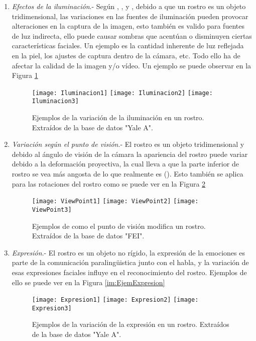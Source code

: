 \begin{enumerate}%
\item \textit{Efectos de la iluminación}.- Según \cite{kalocsai1998face}, \cite{johnston1992recognising}, \cite{bruce1998human} y \cite{hill1996effects}, debido a que un rostro es un objeto tridimensional, las variaciones en las fuentes de iluminación pueden provocar alteraciones en la captura de la imagen, esto también es valido para fuentes de luz indirecta, ello puede causar sombras que acentúan o disminuyen ciertas características faciales. Un ejemplo es la cantidad inherente de luz reflejada en la piel, los ajustes de captura dentro de la cámara, etc. Todo ello ha de afectar la calidad de la imagen y/o vídeo. Un ejemplo se puede observar en la Figura \ref{im:EjemIluminacion}
\begin{figure}[h]
\center
\texttt{[image: Iluminacion1]}
\texttt{[image: Iluminacion2]}
\texttt{[image: Iluminacion3]}
\caption{Ejemplos de la variación de la iluminación en un rostro. Extraídos de la base de datos "Yale A".}
\label{im:EjemIluminacion}
\end{figure}
\item \textit{Variación según el punto de visión}.- El rostro es un objeto tridimensional y debido al ángulo de visión de la cámara la apariencia del rostro puede variar debido a la deformación proyectiva, la cual lleva a que la parte inferior de rostro se vea más angosta de lo que realmente es (\cite{hill1997information}). Esto también se aplica para las rotaciones del rostro como se puede ver en la Figura \ref{im:EjemViewPoint}
\begin{figure}[h]
\center
\texttt{[image: ViewPoint1]}
\texttt{[image: ViewPoint2]}
\texttt{[image: ViewPoint3]}
\caption{Ejemplos de como el punto de visión modifica un rostro. Extraídos de la base de datos "FEI".}
\label{im:EjemViewPoint}
\end{figure}
\item \textit{Expresión}.-  El rostro es un objeto no rígido, la expresión de la emociones es parte de la comunicación paralingüistica junto con el habla, y la variación de esas expresiones faciales influye en el reconocimiento del rostro. Ejemplos de ello se puede ver en la Figura \ref{im:EjemExpresion}
\begin{figure}[h]
\center
\texttt{[image: Expresion1]}
\texttt{[image: Expresion2]}
\texttt{[image: Expresion3]}
\caption{Ejemplos de la variación de la expresión en un rostro. Extraídos de la base de datos "Yale A".}

\end{figure}
\end{enumerate}

